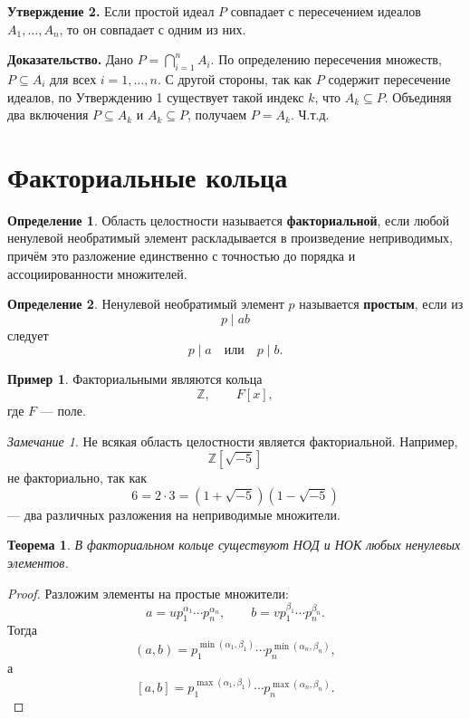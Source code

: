 \documentclass[12pt, a4paper]{article}
\newtheorem{theorem}{Теорема}
\theoremstyle{definition}
\newtheorem{definition}{Определение}
\newtheorem{example}{Пример}
\theoremstyle{remark}
\newtheorem*{remark}{Замечание}
\newcommand{\Z}{\mathbb{Z}}
\begin{document}
\textbf{Утверждение 2.} Если простой идеал $P$ совпадает с пересечением идеалов $A_1, \dots, A_n$, то он совпадает с одним из них.

\textbf{Доказательство.} Дано $P = \bigcap_{i=1}^n A_i$. 
По определению пересечения множеств, $P \subseteq A_i$ для всех $i = 1, \dots, n$.
С другой стороны, так как $P$ содержит пересечение идеалов, по Утверждению 1 существует такой индекс $k$, что $A_k \subseteq P$.
Объединяя два включения $P \subseteq A_k$ и $A_k \subseteq P$, получаем $P = A_k$. Ч.т.д.

\section{Факториальные кольца}

\begin{definition}
	Область целостности называется \textbf{факториальной}, если любой ненулевой необратимый элемент раскладывается в произведение неприводимых, причём это разложение единственно с точностью до порядка и ассоциированности множителей.
\end{definition}

\begin{definition}
	Ненулевой необратимый элемент $p$ называется \textbf{простым}, если из
	\[
	p\mid ab
	\]
	следует
	\[
	p\mid a \quad \text{или}\quad p\mid b.
	\]
\end{definition}

\begin{example}
	Факториальными являются кольца
	\[
	\Z,\qquad F[x],
	\]
	где $F$ --- поле.
\end{example}

\begin{remark}
	Не всякая область целостности является факториальной. Например,
	\[
	\Z[\sqrt{-5}]
	\]
	не факториально, так как
	\[
	6=2\cdot3=(1+\sqrt{-5})(1-\sqrt{-5})
	\]
	--- два различных разложения на неприводимые множители.
\end{remark}

\begin{theorem}
	В факториальном кольце существуют НОД и НОК любых ненулевых элементов.
\end{theorem}

\begin{proof}
	Разложим элементы на простые множители:
	\[
	a=u p_1^{\alpha_1}\cdots p_n^{\alpha_n},\qquad
	b=v p_1^{\beta_1}\cdots p_n^{\beta_n}.
	\]
	Тогда
	\[
	(a,b)=p_1^{\min(\alpha_1,\beta_1)}\cdots p_n^{\min(\alpha_n,\beta_n)},
	\]
	а
	\[
	[a,b]=p_1^{\max(\alpha_1,\beta_1)}\cdots p_n^{\max(\alpha_n,\beta_n)}.
	\]
\end{proof}
\end{document}
